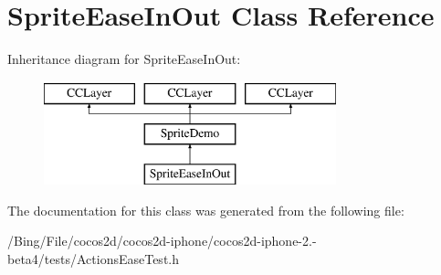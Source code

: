 \hypertarget{interface_sprite_ease_in_out}{\section{Sprite\-Ease\-In\-Out Class Reference}
\label{interface_sprite_ease_in_out}
}
Inheritance diagram for Sprite\-Ease\-In\-Out\-:\begin{figure}[H]
\begin{center}
\leavevmode
\includegraphics[height=3.000000cm]{interface_sprite_ease_in_out}
\end{center}
\end{figure}


The documentation for this class was generated from the following file\-:\begin{DoxyCompactItemize}
\item 
/\-Bing/\-File/cocos2d/cocos2d-\/iphone/cocos2d-\/iphone-\/2.-\/beta4/tests/Actions\-Ease\-Test.\-h\end{DoxyCompactItemize}
